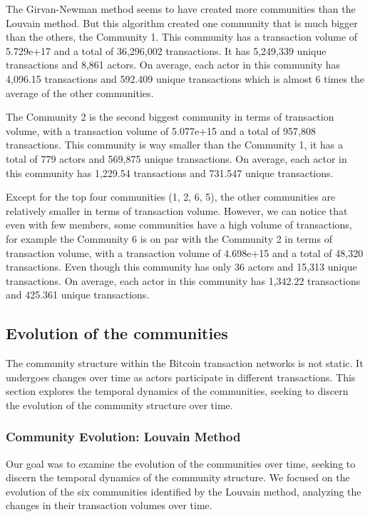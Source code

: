 \documentclass[a4paper, 12pt]{article}
\begin{document}
The Girvan-Newman method seems to have created more communities than the Louvain method. But this algorithm
created one community that is much bigger than the others, the Community 1. This community has a transaction volume of 5.729e+17 and a total of 36,296,002 transactions.
It has 5,249,339 unique transactions and 8,861 actors. On average, each actor in this community has 4,096.15 transactions and 592.409 unique transactions which is almost 6 times the average of the other communities.

The Community 2 is the second biggest community in terms of transaction volume, with a transaction volume of 5.077e+15 and a total of 957,808 transactions.
This community is way smaller than the Community 1, it has a total of 779 actors and 569,875 unique transactions. On average, each actor in this community has 1,229.54 transactions and 731.547 unique transactions.

Except for the top four communities (1, 2, 6, 5), the other communities are relatively smaller in terms of transaction volume.
However, we can notice that even with few members, some communities have a high volume of transactions, 
for example the Community 6 is on par with the Community 2 in terms of transaction volume, with a transaction volume of 4.698e+15 and a total of 48,320 transactions.
Even though this community has only 36 actors and 15,313 unique transactions. On average, each actor in this community has 1,342.22 transactions and 425.361 unique transactions.


\subsection{Evolution of the communities}
The community structure within the Bitcoin transaction networks is not static. It undergoes changes over time as actors participate in different transactions.
This section explores the temporal dynamics of the communities, seeking to discern the evolution of the community structure over time.

\subsubsection{Community Evolution: Louvain Method}

Our goal was to examine the evolution of the communities over time, seeking to discern the temporal dynamics of the community structure. 
We focused on the evolution of the six communities identified by the Louvain method, analyzing the changes in their transaction volumes over time.
\end{document}
